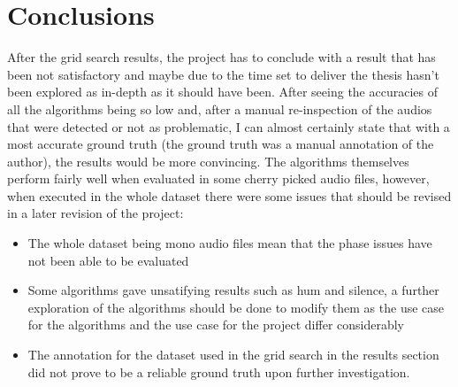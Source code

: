 
\chapter{Conclusions}

After the grid search results, the project has to conclude with a result that has been not satisfactory and maybe due to the time set to deliver the thesis hasn't been explored as in-depth as it should have been. After seeing the accuracies of all the algorithms being so low and, after a manual re-inspection of the audios that were detected or not as problematic, I can almost certainly state that with a most accurate ground truth (the ground truth was a manual annotation of the author), the results would be more convincing. The algorithms themselves perform fairly well when evaluated in some cherry picked audio files, however, when executed in the whole dataset there were some issues that should be revised in a later revision of the project:
\begin{itemize}
    \item The whole dataset being mono audio files mean that the phase issues have not been able to be evaluated
    \item Some algorithms gave unsatifying results such as hum and silence, a further exploration of the algorithms should be done to modify them as the use case for the algorithms and the use case for the project differ considerably
    \item The annotation for the dataset used in the grid search in the results section did not prove to be a reliable ground truth upon further investigation.
\end{itemize}

\newpage


